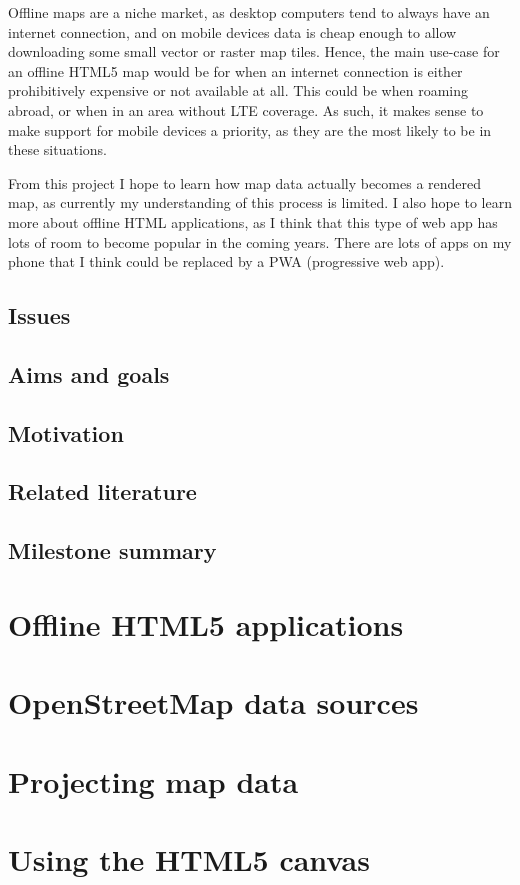 \documentclass[]{final_report}
\begin{document}
Offline maps are a niche market, as desktop computers tend to always have an internet connection, and on mobile devices data is cheap enough to allow downloading some small vector or raster map tiles. Hence, the main use-case for an offline HTML5 map would be for when an internet connection is either prohibitively expensive or not available at all. This could be when roaming abroad, or when in an area without LTE coverage. As such, it makes sense to make support for mobile devices a priority, as they are the most likely to be in these situations.

From this project I hope to learn how map data actually becomes a rendered map, as currently my understanding of this process is limited. I also hope to learn more about offline HTML applications, as I think that this type of web app has lots of room to become popular in the coming years. There are lots of apps on my phone that I think could be replaced by a PWA (progressive web app).

\section{Issues}

\section{Aims and goals}

\section{Motivation}

\section{Related literature}

\section{Milestone summary}

\chapter{Offline HTML5 applications}

\chapter{OpenStreetMap data sources}

\chapter{Projecting map data}

\chapter{Using the HTML5 canvas}

\printbibliography{}
\end{document}
